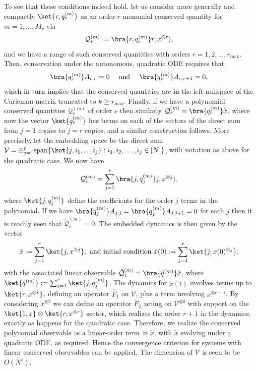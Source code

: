 \documentclass[superscriptaddress,onecolumn,nofootinbib,longbibliography,a4paper,accepted=2026-09-29]{quantumarticle}
\theoremstyle{plain}
\theoremstyle{definition}
\numberwithin{thm}{section}
\numberwithin{assumption}{section}
\numberwithin{lemma}{section}
\numberwithin{prop}{section}
\numberwithin{cor}{section}
\numberwithin{definition}{section}
\numberwithin{rmk}{section}
\numberwithin{equation}{section}
\newcommand\Q{ {\mathcal Q} }
\begin{document}
To see that these conditions indeed hold, let us consider more generally and compactly $\ket{r, q_r^{(m)}}$ as an order-$r$ monomial conserved quantity for $m=1,\dots, M_r$ via
\begin{equation}
    \mathcal{Q}^{(m)}_r := \bra{r, q_r^{(m)}} r,x^{\otimes r} \rangle,
\end{equation}
and we have a range of such conserved quantities with orders $r=1,2,\dots ,r_{\max}$. Then, conservation under the autonomous, quadratic ODE requires that
\begin{equation}
    \bra{q_r^{(m)}} A_{r,r} = 0 \quad\mbox{ and }\quad\bra{q_r^{(m)}} A_{r,r+1} = 0 ,
\end{equation}
which in turn implies that the conserved quantities are in the left-nullspace of the Carleman matrix truncated to $k \ge r_{\max}$. Finally, if we have a polynomial conserved quantities $\mathcal{Q}^{(m)}_r$ of order $r$ then similarly $\mathcal{Q}^{(m)}_r = \bra{q_r^{(m)}} \check{x}$, where now the vector $\ket{q_r^{(m)}}$ has terms on each of the sectors of the direct sum from $j=1$ copies to $j=r$ copies, and a similar construction follows. More precisely, let the embedding space be the direct sum $\mathcal{V} = \oplus_{j=1}^r \mbox{span}\{\ket{j, i_1,\dots i_j}: i_1,i_2,\dots ,i_j \in [N]\}$, with notation as above for the quadratic case. We now have
\begin{equation}
    \mathcal{Q}^{(m)}_r = \sum_{j=1}^r\bra{j,q_j^{(m)}}j,x^{\otimes j}\rangle, 
\end{equation}
where $\ket{j,q_j^{(m)}}$ define the coefficients for the order $j$ terms in the polynomial. If we have $\bra{q_j^{(m)}} A_{j,j} =\bra{q_j^{(m)}} A_{j,j+1} =0 $ for each $j$ then it is readily seen that $\dot{\Q}_r^{(m)}=0$. The embedded dynamics is then given by the vector
\begin{equation}
    \check{x} := \sum_{j=1}^r\ket{j,x^{\otimes j}}, \mbox{ and initial condition } \check{x}(0) := \sum_{j=1}^r\ket{j,x(0)^{\otimes j}},
\end{equation}
with the associated linear observable $\check{\Q}_1^{(m)} = \bra{\check{q}^{(m)}} \check{x}$, where $\ket{\check{q}^{(m)}} := \sum_{j=1}^r\ket{j,q_j^{(m)}}$. The dynamics for $\check{x}(t)$ involves terms up to $\ket{r,x^{\otimes r}}$, defining an operator $\hat{F}_1$ on $\mathcal{V}$, plus a term involving $x^{\otimes r+1}$. By considering $\check{x}^{\otimes 2}$ we can define an operator $\check{F}_2$ acting on $\mathcal{V}^{\otimes 2}$ with support on the $\ket{1,x}\otimes \ket{r,x^{\otimes r}}$ sector, which realizes the order $r+1$ in the dynamics, exactly as happens for the quadratic case. Therefore, we realize the conserved polynomial observable as a linear-order term in $\check{x}$, with $\check{x}$ evolving under a quadratic ODE, as required. Hence the convergence criterion for systems with linear conserved observables can be applied. The dimension of $\mathcal{V}$ is seen to be $O(N^r)$.
\end{document}
